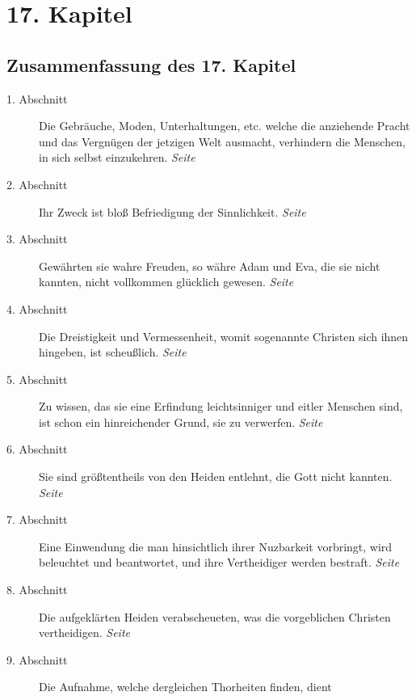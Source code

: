 
\chapter{17. Kapitel} \label{kap17}
\section{Zusammenfassung des 17. Kapitel}

\begin{description}
\item[1. Abschnitt] Die Gebräuche, Moden, Unterhaltungen, etc. welche die
anziehende Pracht und das Vergnügen der jetzigen Welt ausmacht, verhindern die
Menschen, in sich selbst einzukehren.
\dotfill \textit{Seite \pageref{kap17_ab1}}\\
\item[2. Abschnitt] Ihr Zweck ist bloß Befriedigung der Sinnlichkeit.
\dotfill \textit{Seite \pageref{kap17_ab2}}\\
\item[3. Abschnitt] Gewährten sie wahre Freuden, so währe Adam und Eva, die sie
nicht kannten, nicht vollkommen glücklich gewesen.
\dotfill \textit{Seite \pageref{kap17_ab3}}\\
\item[4. Abschnitt] Die Dreistigkeit und Vermessenheit, womit sogenannte
Christen sich ihnen hingeben, ist scheußlich.
\dotfill \textit{Seite \pageref{kap17_ab4}}\\
\item[5. Abschnitt] Zu wissen, das sie eine Erfindung leichtsinniger und eitler
Menschen sind, ist schon ein hinreichender Grund, sie zu verwerfen.
\dotfill \textit{Seite \pageref{kap17_ab5}}\\
\item[6. Abschnitt] Sie sind größtentheils von den Heiden entlehnt, die Gott
nicht kannten.
\dotfill \textit{Seite \pageref{kap17_ab6}}\\
\item[7. Abschnitt] Eine Einwendung die man hinsichtlich ihrer Nuzbarkeit
vorbringt, wird beleuchtet und beantwortet, und ihre Vertheidiger werden
bestraft.
\dotfill \textit{Seite \pageref{kap17_ab7}}\\
\item[8. Abschnitt] Die aufgeklärten Heiden verabscheueten, was die vorgeblichen
Christen vertheidigen.
\dotfill \textit{Seite \pageref{kap17_ab8}}\\
\item[9. Abschnitt] Die Aufnahme, welche dergleichen Thorheiten finden, dient

\end{description}
